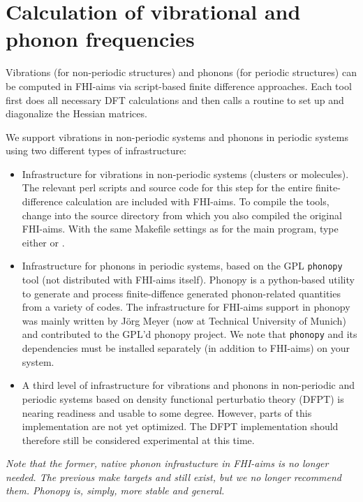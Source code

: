 \section{Calculation of vibrational and phonon frequencies}
\label{Sec:vib}

Vibrations (for non-periodic structures) and phonons (for periodic
structures) can be computed in FHI-aims via script-based finite
difference approaches. Each tool first does all necessary DFT
calculations and then calls a routine to set up and diagonalize the
Hessian matrices. 

We support vibrations in non-periodic systems and phonons in periodic
systems using two different types of infrastructure:
\begin{itemize}
  \item Infrastructure for vibrations in non-periodic systems
    (clusters or molecules). The relevant perl scripts and source code
    for this step for the entire finite-difference calculation are
    included with FHI-aims. To compile the tools, change into the
    source directory from which you also compiled the original
    FHI-aims. With the same Makefile settings as for the main program,
    type either  or . 
  \item Infrastructure for phonons in periodic systems, based on the GPL
    \texttt{phonopy} tool (not distributed with FHI-aims
    itself). Phonopy is a python-based utility to generate and process
    finite-diffence generated phonon-related quantities from a variety
    of codes. The infrastructure for FHI-aims support in phonopy was
    mainly written by J\"org Meyer (now at Technical University of
    Munich) and contributed to the GPL'd phonopy project. We note that
    \texttt{phonopy} and its dependencies must be installed separately
    (in addition to FHI-aims) on your system.
  \item A third level of infrastructure for vibrations and phonons in
    non-periodic and periodic systems based on density functional
    perturbatio theory (DFPT) is nearing readiness and usable to some
    degree. However, parts of this implementation are not yet
    optimized. The DFPT implementation should therefore still be
    considered experimental at this time. 
\end{itemize}


\emph{Note that the former, native phonon infrastucture in FHI-aims is
  no longer needed. The previous make targets  and
     still exist, but we no longer recommend them.
    Phonopy is, simply, more stable and general.}

